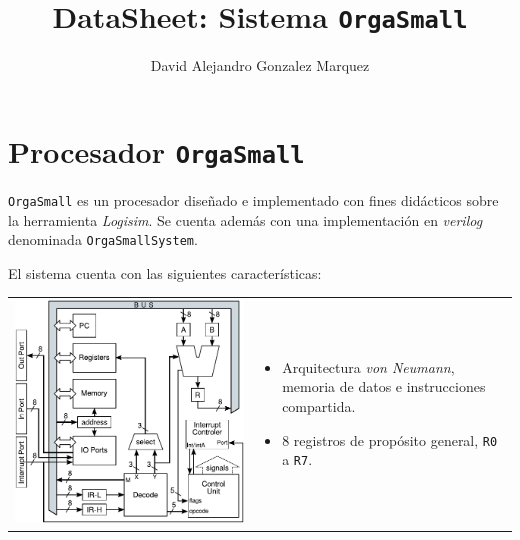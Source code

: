 \documentclass[a4paper,11pt]{article}
\title{DataSheet: Sistema \texttt{OrgaSmall}}
\author{David Alejandro Gonzalez Marquez}
\date{}
\begin{document}
\maketitle

\section*{Procesador \texttt{OrgaSmall}}

\texttt{OrgaSmall} es un procesador diseñado e implementado con fines didácticos sobre la herramienta \emph{Logisim}.
Se cuenta además con una implementación en \emph{verilog} denominada \texttt{OrgaSmallSystem}.

\noindent El sistema cuenta con las siguientes características:

\begin{center}
\begin{tabular}[c]{p{6.5cm}p{8cm}}
\includegraphics[scale=0.7]{img/arquitectura_micro_IO.pdf}
&
\vspace{-7cm}
\begin{minipage}{8cm}
\begin{itemize}
  \setlength\itemsep{0em}
 \item Arquitectura \emph{von Neumann}, memoria de datos e instrucciones compartida.
 \item 8 registros de propósito general, \texttt{R0} a \texttt{R7}.

\end{itemize}
\end{minipage}
\end{tabular}
\end{center}
\end{document}
